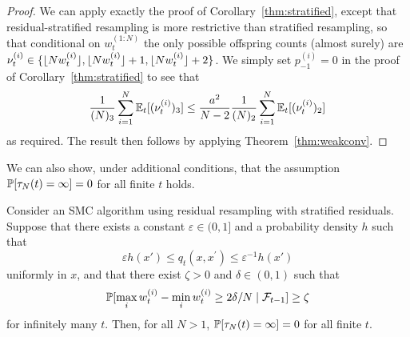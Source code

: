 \begin{proof}
We can apply exactly the proof of Corollary~\ref{thm:stratified}, except that residual-stratified resampling is more restrictive than stratified resampling, so that conditional on $w_t^{(1:N)}$ the only possible offspring counts (almost surely) are $\nu_t^{(i)} \in \{ \lfloor N w_t^{(i)} \rfloor, \lfloor N w_t^{(i)} \rfloor +1, \lfloor N w_t^{(i)} \rfloor +2 \}$. We simply set $p_{-1}^{(i)} = 0$ in the proof of Corollary~\ref{thm:stratified} to see that
\begin{equation*}
\frac{1}{(N)_3} \sum_{i=1}^{N} \mathbb{E}_t [(\nu_t^{(i)})_3 ]
\leq \frac{a^2}{N-2} \frac{1}{(N)_2} \sum_{i=1}^{N} \mathbb{E}_t [(\nu_t^{(i)})_2 ]
\end{equation*}
as required.
The result then follows by applying Theorem~\ref{thm:weakconv}.
\end{proof}
We can also show, under additional conditions, that the assumption $\mathbb{P}[ \tau_N(t) = \infty ] =0$ for all finite $t$ holds.

\begin{prop}\label{thm:resstrat_nontriviality}
Consider an SMC algorithm using residual resampling with stratified residuals.
Suppose that there exists a constant $\varepsilon \in (0,1]$ and a probability density $h$ such that
\begin{equation*}
\varepsilon h(x') \leq q_t(x, x^\prime) \leq \varepsilon^{-1} h(x')
\end{equation*}
uniformly in $x$, and that there exist $\zeta >0$ and $\delta \in (0,1)$ such that 
\begin{equation*}
\mathbb{P}[ \max_i w_t^{(i)} - \min_i w_t^{(i)} \geq 2\delta/N \mid \mathcal{F}_{t-1} ] \geq \zeta
\end{equation*}
 for infinitely many $t$. Then, for all $N>1$, $\mathbb{P}[ \tau_N(t) = \infty ] =0$ for all finite $t$.
\end{prop}

